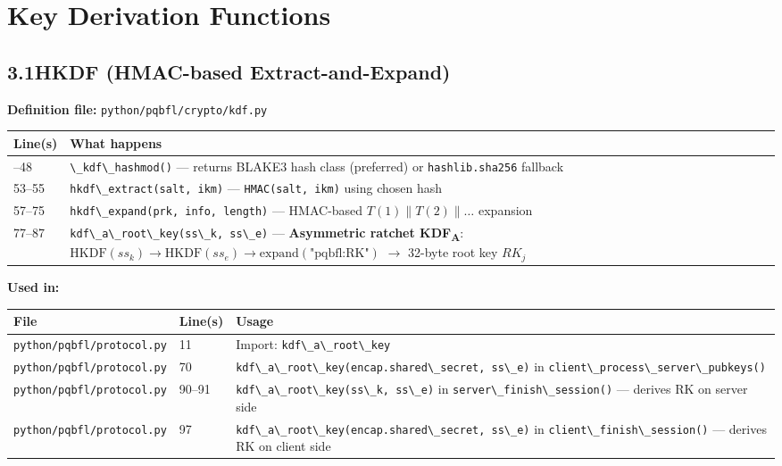 \documentclass[11pt,a4paper]{article}
\newcommand{\code}[1]{\lstinline[basicstyle=\ttfamily\small]!#1!}
\begin{document}
\section{Key Derivation Functions}

\subsection{3.1\quad HKDF (HMAC-based Extract-and-Expand)}

\textbf{Definition file:} \code{python/pqbfl/crypto/kdf.py}

\begin{longtable}{L{2.2cm} L{11.5cm}}
\toprule
\textbf{Line(s)} & \textbf{What happens} \\
\midrule
\endhead
\bottomrule
{}--48   & \code{\_kdf\_hashmod()} --- returns BLAKE3 hash class (preferred) or \code{hashlib.sha256} fallback \\
53--55  & \code{hkdf\_extract(salt, ikm)} --- \code{HMAC(salt, ikm)} using chosen hash \\
57--75  & \code{hkdf\_expand(prk, info, length)} --- HMAC-based $T(1) \| T(2) \| \ldots$ expansion \\
77--87  & \code{kdf\_a\_root\_key(ss\_k, ss\_e)} --- \textbf{Asymmetric ratchet KDF\textsubscript{A}}: $\text{HKDF}(ss_k) \to \text{HKDF}(ss_e) \to \text{expand}(\text{"pqbfl:RK"})$ $\to$ 32-byte root key $RK_j$ \\
\end{longtable}

\textbf{Used in:}

\begin{longtable}{L{5.5cm} L{1.8cm} L{7cm}}
\toprule
\textbf{File} & \textbf{Line(s)} & \textbf{Usage} \\
\midrule
\endhead
\bottomrule
\endfoot
\code{python/pqbfl/protocol.py} & 11      & Import: \code{kdf\_a\_root\_key} \\
\code{python/pqbfl/protocol.py} & 70      & \code{kdf\_a\_root\_key(encap.shared\_secret, ss\_e)} in \code{client\_process\_server\_pubkeys()} \\
\code{python/pqbfl/protocol.py} & 90--91  & \code{kdf\_a\_root\_key(ss\_k, ss\_e)} in \code{server\_finish\_session()} --- derives RK on server side \\
\code{python/pqbfl/protocol.py} & 97      & \code{kdf\_a\_root\_key(encap.shared\_secret, ss\_e)} in \code{client\_finish\_session()} --- derives RK on client side \\
\end{longtable}
\end{document}
